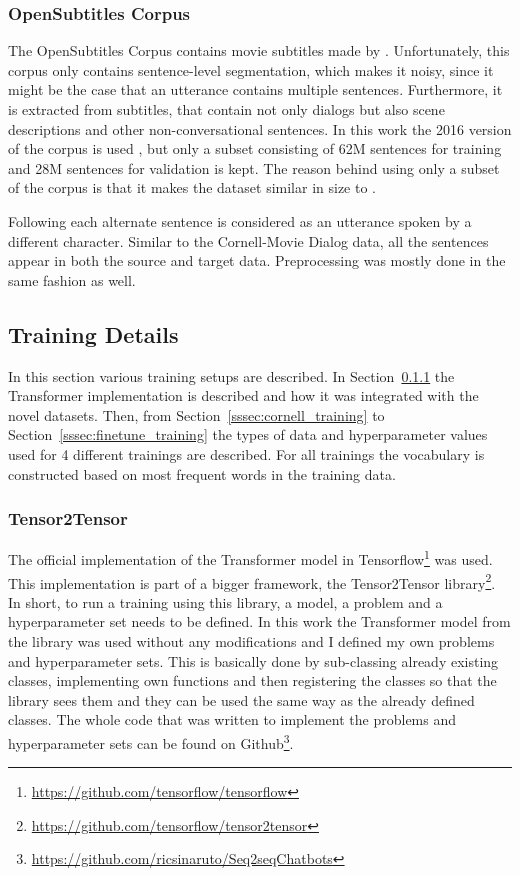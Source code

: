 \documentclass[12pt]{article}
\begin{document}
\subsubsection{OpenSubtitles Corpus} \label{sssec:opensubs}
The OpenSubtitles Corpus contains movie subtitles made by \cite{opensubtitles}. Unfortunately, this corpus only contains sentence-level segmentation, which makes it noisy, since it might be the case that an utterance contains multiple sentences. Furthermore, it is extracted from subtitles, that contain not only dialogs but also scene descriptions and other non-conversational sentences. In this work the 2016 version of the corpus is used \cite{OpenSubtitles:2016}, but only a subset consisting of 62M sentences for training and 28M sentences for validation is kept. The reason behind using only a subset of the corpus is that it makes the dataset similar in size to \cite{Vinyals:2015}.

Following \cite{Vinyals:2015} each alternate sentence is considered as an utterance spoken by a different character. Similar to the Cornell-Movie Dialog data, all the sentences appear in both the source and target data. Preprocessing was mostly done in the same fashion as well.

\subsection{Training Details} \label{ssec:43}
In this section various training setups are described. In Section~\ref{sssec:t2t} the Transformer implementation is described and how it was integrated with the novel datasets. Then, from Section~\ref{sssec:cornell_training} to Section~\ref{sssec:finetune_training} the types of data and hyperparameter values used for 4 different trainings are described. For all trainings the vocabulary is constructed based on most frequent words in the training data.

\subsubsection{Tensor2Tensor} \label{sssec:t2t}
The official implementation of the Transformer model in Tensorflow\footnote{\url{https://github.com/tensorflow/tensorflow}} was used. This implementation is part of a bigger framework, the Tensor2Tensor library\footnote{\url{https://github.com/tensorflow/tensor2tensor}}. In short, to run a training using this library, a model, a problem and a hyperparameter set needs to be defined. In this work the Transformer model from the library was used without any modifications and I defined my own problems and hyperparameter sets. This is basically done by sub-classing already existing classes, implementing own functions and then registering the classes so that the library sees them and they can be used the same way as the already defined classes. The whole code that was written to implement the problems and hyperparameter sets can be found on Github\footnote{\url{https://github.com/ricsinaruto/Seq2seqChatbots}}.
\end{document}
